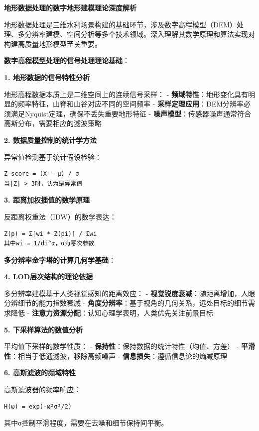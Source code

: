 \textbf{地形数据处理的数字地形建模理论深度解析}

地形数据处理是三维水利场景构建的基础环节，涉及数字高程模型（DEM）处理、多分辨率建模、空间分析等多个技术领域。深入理解其数学原理和算法实现对构建高质量地形模型至关重要。

\textbf{数字高程模型处理的信号处理理论基础}：

\textbf{1. 地形数据的信号特性分析}

地形高程数据本质上是二维空间上的连续信号采样： - \textbf{频域特性}：地形变化具有明显的频率特征，山脊和山谷对应不同的空间频率 - \textbf{采样定理应用}：DEM分辨率必须满足Nyquist定理，确保不丢失重要地形特征 - \textbf{噪声模型}：传感器噪声通常符合高斯分布，需要相应的滤波策略

\textbf{2. 数据质量控制的统计学方法}

异常值检测基于统计假设检验：

\begin{lstlisting}
Z-score = (X - μ) / σ
当|Z| > 3时，认为是异常值
\end{lstlisting}

\textbf{3. 距离加权插值的数学原理}

反距离权重法（IDW）的数学表达：

\begin{lstlisting}
Z(p) = Σ[wi * Z(pi)] / Σwi
其中wi = 1/di^α，α为幂次参数
\end{lstlisting}

\textbf{多分辨率金字塔的计算几何学基础}：

\textbf{4. LOD层次结构的理论依据}

多分辨率建模基于人类视觉感知的距离效应： - \textbf{视觉锐度衰减}：随距离增加，人眼分辨细节的能力指数衰减 - \textbf{角度分辨率}：基于视角的几何关系，远处目标的细节需求降低 - \textbf{注意力资源分配}：认知心理学表明，人类优先关注前景目标

\textbf{5. 下采样算法的数值分析}

平均值下采样的数学性质： - \textbf{保持性}：保持数据的统计特性（均值、方差） - \textbf{平滑性}：相当于低通滤波，移除高频噪声 - \textbf{信息损失}：遵循信息论的熵减原理

\textbf{6. 高斯滤波的频域特性}

高斯滤波器的频率响应：

\begin{lstlisting}
H(ω) = exp(-ω²σ²/2)
\end{lstlisting}

其中σ控制平滑程度，需要在去噪和细节保持间平衡。

